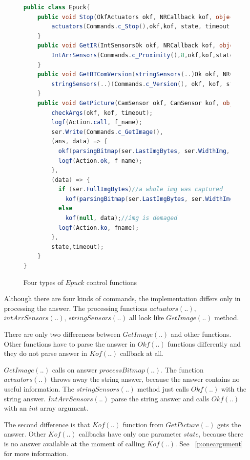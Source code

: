\documentclass[12pt,notitlepage]{report}
\begin{document}
\begin{figure}[!hbp]
\begin{lstlisting}[language=cs]
public class Epuck{
	public void Stop(OkfActuators okf, NRCallback kof, object state, double timeout) {
		actuators(Commands.c_Stop(),okf,kof, state, timeout, "Stop(..)");
	}
	public void GetIR(IntSensorsOk okf, NRCallback kof, object state, double timeout) {
		IntArrSensors(Commands.c_Proximity(),8,okf,kof,state,timeout,"GetIR(..)");
	}
	public void GetBTComVersion(stringSensors(..)Ok okf, NRCallback kof, object state, double timeout) {
		stringSensors(..)(Commands.c_Version(), okf, kof, state, timeout, "BTComVersion(..)");
	}
	public void GetPicture(CamSensor okf, CamSensor kof, object state, double timeout) {
		checkArgs(okf, kof, timeout);
		logf(Action.call, f_name);
		ser.Write(Commands.c_GetImage(),
		(ans, data) => {
		  okf(parsingBitmap(ser.LastImgBytes, ser.WidthImg, ser.HeightImg, ser.ModeImg), data);
		  logf(Action.ok, f_name);
		},
		(data) => {
		  if (ser.FullImgBytes)//a whole img was captured
		    kof(parsingBitmap(ser.LastImgBytes, ser.WidthImg, ser.HeightImg, ser.ModeImg), data);
		  else
		    kof(null, data);//img is demaged
		  logf(Action.ko, fname);
		},
		state,timeout);		
	}	   
}
\end{lstlisting}
\caption{Four types of $Epuck$ control functions}
\label{publicep}	
\end{figure}

	Although there are four kinds of commands, the implementation differs only in processing the answer.
	The processing functions $actuators(..)$, $intArrSensors(..)$, $stringSensors(..)$ all 
	look like $GetImage(..)$ method.
	
	There are only two differences between $GetImage(..)$ and other functions.
	Other functions have to parse the answer in $Okf(..)$ functions differently and they do not parse
	answer in $Kof(..)$ callback at all.

	$GetImage(..)$ calls on answer $processBitmap(..)$.
	The function $actuators(..)$ throws away the string answer, because the answer contains no useful information.
	The $stringSensors(..)$ method just calls $Okf(..)$ with the string answer.
	$IntArrSensors(..)$ parse the string answer and calls $Okf(..)$ with an $int$ array argument.

	The second difference is that $Kof(..)$ function from $GetPicture(..)$ gets the answer. 
	Other $Kof(..)$ callbacks have only one parameter $state$, 
	because there is no answer available at the moment of calling $Kof(..)$.
	See ~\ref{p:oneargument} for more information.
\end{document}

